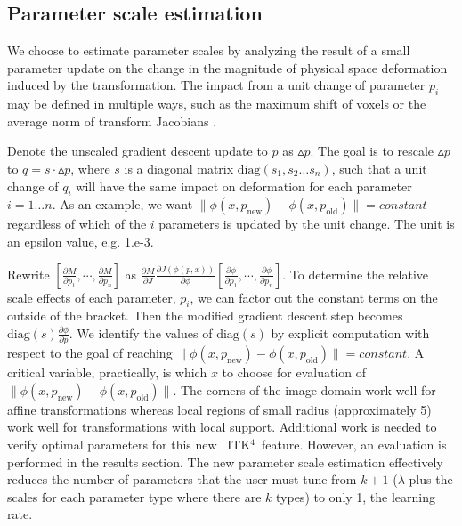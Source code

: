 \documentclass{llncs}
\newcommand{\tk}{~ITK$^{\text{4}}$~}
\begin{document}
\subsection{Parameter scale estimation}
We choose to estimate parameter scales by analyzing the result of a
small parameter update on the change in the magnitude of physical space deformation
induced by the transformation.  The impact from a unit change of
parameter $p_i$ may be defined in multiple ways, such as the maximum shift of
voxels or the average norm of transform Jacobians \cite{Jenkinson2001}.

Denote the unscaled gradient descent update to $p$ as $\vartriangle
p$.  The goal is to rescale $\vartriangle p$ to $q = s \cdot \vartriangle p$, where $s$ is a diagonal
matrix $\text{diag} (s_1, s_2 \ldots s_n)$, such that a unit change of $q_i$ will have
the same impact on deformation for each parameter $i = 1... n$.   
As an example, we want $ \| \phi(x,p_{\text{new}}) -
\phi(x,p_\text{old}) \| = constant $ regardless of which of the
$i$ parameters is updated by the unit change.  The unit is an epsilon
value, e.g. 1.e-3.

Rewrite $[ \frac{\partial
  M}{\partial p_1} , \cdots , \frac{\partial
  M}{\partial p_n} 
 ]$ as $\frac{\partial M}{\partial J}\frac{\partial
  J(\phi(p,x))}{\partial \phi} [ \frac{\partial \phi}{\partial p_1} , \cdots , \frac{\partial \phi}{\partial p_n} ]$.
To determine the relative scale effects of each parameter, $p_i$, we
can factor out the constant terms on the outside of the bracket.  
Then the modified gradient descent step becomes
$\text{diag}(s)\frac{\partial \phi}{\partial p}$.  We identify the values
of $\text{diag}(s)$ by explicit computation with respect to the goal of reaching $\| \phi(x,p_{\text{new}}) -
\phi(x,p_\text{old}) \| = constant $.  A critical variable,
practically, is which $x$ to choose for evaluation of $\| \phi(x,p_{\text{new}}) -
\phi(x,p_\text{old}) \| $.  The corners of the image domain work well
for affine transformations whereas local regions of small radius
(approximately 5) work well for transformations with local support.
Additional work is needed to verify optimal parameters for this new
\tk feature.  However, an evaluation is performed in the results
section.  The new parameter scale estimation effectively reduces the number of parameters
that the user must tune from $k+1$ ($\lambda$ plus the scales for each
parameter type where there are $k$ types) to only 1, the learning
rate.  
\end{document}
